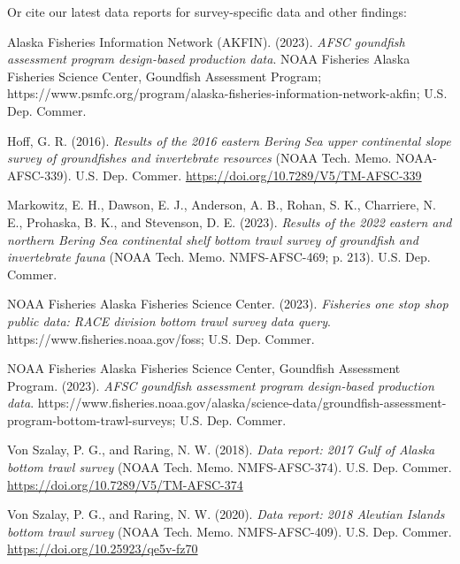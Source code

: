 \documentclass[
  letterpaper,
  oneside,
  open=any]{scrbook}
\newlength{\cslhangindent}
\newlength{\cslentryspacingunit} %
\newenvironment{CSLReferences}[2] %
 {%
  \setlength{\parindent}{0pt}
  \ifodd #1
  \let\oldpar\par
  \def\par{\hangindent=\cslhangindent\oldpar}
  \fi
  \setlength{\parskip}{#2\cslentryspacingunit}
 }%
 {}
\begin{document}
Or cite our latest data reports for survey-specific data and other
findings:

\hypertarget{refs}{}
\begin{CSLReferences}{1}{0}
\leavevmode{}%
Alaska Fisheries Information Network (AKFIN). (2023). \emph{AFSC
goundfish assessment program design-based production data}. {NOAA
Fisheries Alaska Fisheries Science Center, Goundfish Assessment
Program};
https://www.psmfc.org/program/alaska-fisheries-information-network-akfin;
{U.S. Dep. Commer.}

\leavevmode{}%
Hoff, G. R. (2016). \emph{Results of the 2016 eastern {Bering Sea} upper
continental slope survey of groundfishes and invertebrate resources}
(NOAA Tech. Memo. NOAA-AFSC-339). {U.S. Dep. Commer.}
\url{https://doi.org/10.7289/V5/TM-AFSC-339}

\leavevmode{}%
Markowitz, E. H., Dawson, E. J., Anderson, A. B., Rohan, S. K.,
Charriere, N. E., Prohaska, B. K., and Stevenson, D. E. (2023).
\emph{Results of the 2022 eastern and northern {Bering Sea} continental
shelf bottom trawl survey of groundfish and invertebrate fauna} (NOAA
Tech. Memo. NMFS-AFSC-469; p. 213). {U.S. Dep. Commer.}

\leavevmode{}%
NOAA Fisheries Alaska Fisheries Science Center. (2023). \emph{Fisheries
one stop shop public data: RACE division bottom trawl survey data
query}. https://www.fisheries.noaa.gov/foss; {U.S. Dep. Commer.}

\leavevmode{}%
NOAA Fisheries Alaska Fisheries Science Center, Goundfish Assessment
Program. (2023). \emph{AFSC goundfish assessment program design-based
production data}.
https://www.fisheries.noaa.gov/alaska/science-data/groundfish-assessment-program-bottom-trawl-surveys;
{U.S. Dep. Commer.}

\leavevmode{}%
Von Szalay, P. G., and Raring, N. W. (2018). \emph{Data report: 2017
{Gulf of Alaska} bottom trawl survey} (NOAA Tech. Memo. NMFS-AFSC-374).
{U.S. Dep. Commer.} \url{https://doi.org/10.7289/V5/TM-AFSC-374}

\leavevmode{}%
Von Szalay, P. G., and Raring, N. W. (2020). \emph{Data report: 2018
{Aleutian Islands} bottom trawl survey} (NOAA Tech. Memo.
NMFS-AFSC-409). {U.S. Dep. Commer.}
\url{https://doi.org/10.25923/qe5v-fz70}

\end{CSLReferences}
\end{document}

